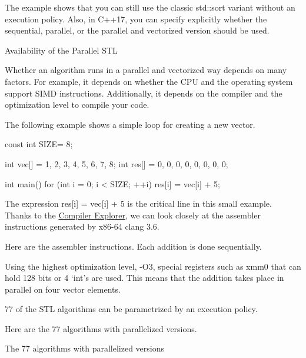 The example shows that you can still use the classic std::sort variant without an execution policy. Also, in C++17, you can specify explicitly whether the sequential, parallel, or the parallel and vectorized version should be used.


\begin{myTip}{Availability of the Parallel STL}
	
Whether an algorithm runs in a parallel and vectorized way depends on many factors. For example, it depends on whether the CPU and the operating system support SIMD instructions. Additionally, it depends on the compiler and the optimization level to compile your code.

The following example shows a simple loop for creating a new vector.

\begin{cpp}
const int SIZE= 8;

int vec[] = {1, 2, 3, 4, 5, 6, 7, 8};
int res[] = {0, 0, 0, 0, 0, 0, 0, 0};

int main(){
	for (int i = 0; i < SIZE; ++i) {
		res[i] = vec[i] + 5;
	}
}
\end{cpp}

The expression res[i] = vec[i] + 5 is the critical line in this small example. Thanks to the \href{https://godbolt.org/}{Compiler Explorer}, we can look closely at the assembler instructions generated by x86-64 clang 3.6.


Here are the assembler instructions. Each addition is done sequentially.




Using the highest optimization level, -O3, special registers such as xmm0 that can hold 128 bits or 4 ‘int’s are used. This means that the addition takes place in parallel on four vector elements.


\end{myTip}

77 of the STL algorithms can be parametrized by an execution policy.


Here are the 77 algorithms with parallelized versions.

\begin{center}
The 77 algorithms with parallelized versions
\end{center}

